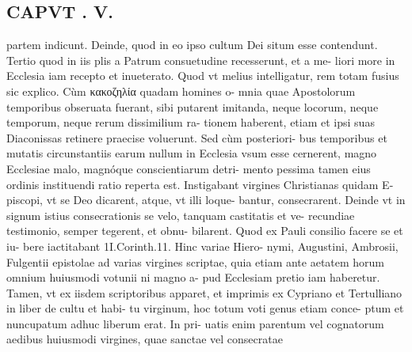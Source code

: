 \documentclass{article}
\begin{document}
\begin{pages}
\section*{CAPVT . V. }
\marginpar{[ p.291 ]}\pstart partem indicunt. Deinde, quod in eo ipso cultum Dei situm esse contendunt. Tertio quod in iis plis a Patrum consuetudine recesserunt, et a me- liori more in Ecclesia iam recepto et inueterato.  \pend\pstart Quod vt melius intelligatur, rem totam fusius sic explico. Cùm κακοζηλία quadam homines o- mnia quae Apostolorum temporibus obseruata fuerant, sibi putarent imitanda, neque locorum, neque temporum, neque rerum dissimilium ra- tionem haberent, etiam et ipsi suas Diaconissas retinere praecise voluerunt. Sed cùm posteriori- bus temporibus et mutatis circunstantiis earum nullum in Ecclesia vsum esse cernerent, magno Ecclesiae malo, magnóque conscientiarum detri- mento pessima tamen eius ordinis instituendi ratio reperta est.  \pend\pstart Instigabant virgines Christianas quidam E- piscopi, vt se Deo dicarent, atque, vt illi loque- bantur, consecrarent. Deinde vt in signum istius consecrationis se velo, tanquam castitatis et ve- recundiae testimonio, semper tegerent, et obnu- bilarent. Quod ex Pauli consilio facere se et iu- bere iactitabant 1I.Corinth.11. Hinc variae Hiero- nymi, Augustini, Ambrosii, Fulgentii epistolae ad varias virgines scriptae, quia etiam ante aetatem horum omnium huiusmodi votunii ni magno a- pud Ecclesiam pretio iam haberetur. Tamen, vt ex iisdem scriptoribus apparet, et imprimis ex Cypriano et Tertulliano in liber  de cultu et habi- tu virginum, hoc totum voti genus etiam conce- ptum et nuncupatum adhuc liberum erat. In pri- uatis enim parentum vel cognatorum aedibus huiusmodi virgines, quae sanctae vel consecratae  \pend

\end{pages}
\end{document}
